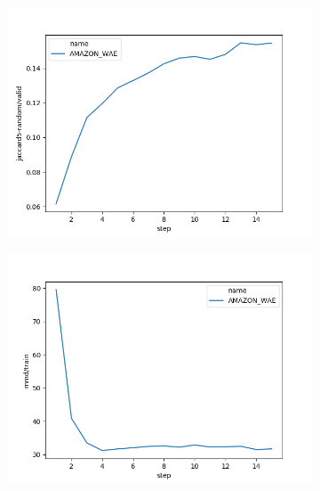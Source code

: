 \begin{figure}[h]
\begin{subfigure}{0.3\textheight}
        \caption{}
        \label{fig:chap4:amazon_latent_cls}
    \end{subfigure}
    \begin{subfigure}{0.3\textheight}
        \centering
        \includegraphics[width=1.\textwidth]{images/figs2/2020_01_15__11_37_34__jaccard5-random.png}
        \caption{}
        \label{fig:chap4:amazon_jaccard}
    \end{subfigure}
    \begin{subfigure}{0.3\textheight}
        \centering
        \includegraphics[width=1.\textwidth]{images/figs2/2020_01_15__11_37_33__mmd.png}
        \caption{}
        \label{fig:chap4:amazon_mmd}
    \end{subfigure}

\end{figure}
